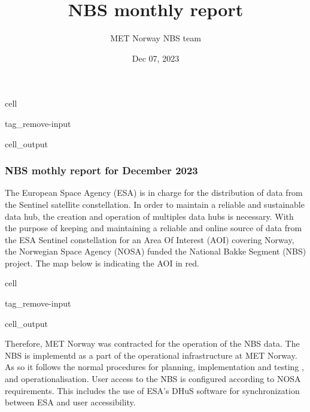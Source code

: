 \documentclass[letterpaper,10pt,english]{jupyterBook}
\title{NBS monthly report}
\date{Dec 07, 2023}
\author{MET Norway \sphinxhyphen{} NBS team}
\begin{document}
\pagestyle{empty}
\sphinxmaketitle
\pagestyle{plain}
\sphinxtableofcontents
\pagestyle{normal}
\label{\detokenize{intro::doc}}
\begin{sphinxuseclass}{cell}
\begin{sphinxuseclass}{tag_remove-input}\begin{sphinxVerbatimOutput}

\begin{sphinxuseclass}{cell_output}\subsubsection*{NBS mothly report for December 2023}

\end{sphinxuseclass}\end{sphinxVerbatimOutput}

\end{sphinxuseclass}
\end{sphinxuseclass}


\begin{DUlineblock}{0em}
\item[] 
\end{DUlineblock}

\sphinxAtStartPar
The European Space Agency (ESA) is in charge for the distribution of data from the Sentinel satellite constellation. In order to maintain a reliable and sustainable data hub, the creation and operation of multiples data hubs is necessary. With the purpose of keeping and maintaining a reliable and online source of data from the ESA Sentinel constellation for an Area Of Interest (AOI) covering Norway, the Norwegian Space Agency (NOSA) funded the National Bakke Segment (NBS) project. The map below is indicating the AOI in red.

\begin{sphinxuseclass}{cell}
\begin{sphinxuseclass}{tag_remove-input}\begin{sphinxVerbatimOutput}

\begin{sphinxuseclass}{cell_output}
\noindent{}

\end{sphinxuseclass}\end{sphinxVerbatimOutput}

\end{sphinxuseclass}
\end{sphinxuseclass}
\sphinxAtStartPar
Therefore, MET Norway was contracted for the operation of the NBS data. The NBS is implementd as a part of the operational infrastructure at MET Norway. As so it follows the normal procedures for planning, implementation and testing , and operationalisation. User access to the NBS is configured according to NOSA requirements. This includes the use of ESA’s DHuS software for synchronization between ESA and user accessibility.
\end{document}
